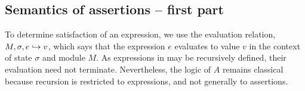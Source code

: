 \subsection{Semantics of assertions %
-- first part}
\label{sect:semantics:assert:standard}

To determine satisfaction of an expression, we    use the evaluation relation, $M, \sigma, e \hookrightarrow v$,
which says that the expression $e$ evaluates
to value $v$ in the context of state $\sigma$ and module $M$.
As expressions in \LangOO may be recursively defined, their evaluation 
need not   %
 terminate. Nevertheless, the logic of $A$ remains classical because recursion is restricted
to expressions, and not generally to assertions.


